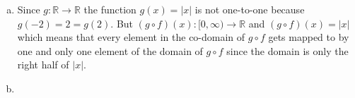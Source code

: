 \begin{enumerate}[(a)]
\item  \label{CompositionTheoryExers-gNot11} 
Since $g\colon \mathbb{R}\to \mathbb{R}$ the function $g(x) = |x|$ is not one-to-one because $g(-2) = 2 = g(2)$. But $(g\circ f)(x)\colon [0,\infty)\to \mathbb{R}$ and $(g\circ f)(x) = |x|$ which means that every element in the co-domain of $g\circ f$ gets mapped to by one and only one element of the domain of $g\circ f$ since the domain is only the right half of $|x|$. 
 
\item  \label{CompositionTheoryExers-what} 
\end{enumerate}

